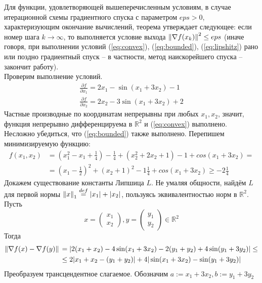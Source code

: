 \documentclass[main.tex]{subfiles}
\begin{document}
Для функции, удовлетворяющей вышеперечисленным условиям, в случае итерационной схемы градиентного спуска с параметром $eps > 0$, характеризующим окончание вычислений, теорема утверждает следующее: 
если номер шага $k\rightarrow \infty$, то выполняется условие выхода $\left\lVert\nabla f(x_k)\right\rVert^2 \le eps$  (иначе говоря, при выполнении условий (\ref{eq:convex}), (\ref{eq:bounded}), (\ref{eq:lipshitz}) рано или поздно градиентный спуск -- в частности, метод наискорейшего спуска -- закончит работу).\\
Проверим выполнение условий.\\
\begin{gather*}
\frac{\partial f}{\partial x_1} = 2x_1 - \sin(x_1+3x_2)-1\\
\frac{\partial f}{\partial x_2} = 2x_2 - 3\sin(x_1+3x_2)+2
\end{gather*}
Частные производные по координатам непрерывны при любых $x_1, x_2$, значит, функция непрерывно дифференцируема в $\mathds{R}^2$ и (\ref{eq:convex}) выполнено.\\
Несложно убедиться, что (\ref{eq:bounded}) также выполнено. Перепишем минимизируемую функцию:
\begin{equation*}
\begin{aligned} %
f(x_1, x_2) {}& = (x_1^2-x_1+\frac{1}{4})-\frac{1}{4}+(x_2^2+2x_2+1)-1 + cos(x_1+3x_2) = \\
 & = (x_1-\frac{1}{2})^2+(x_2+1)^2-1\frac{1}{4}+cos(x_1+3x_2)\ge -2\frac{1}{4}
\end{aligned}
\end{equation*}
Докажем существование константы Липшица $L$. Не умаляя общности, найдём $L$ для первой нормы $\left\lVert x\right\rVert_1\overset{def}{=}|x_1|+|x_2|$, пользуясь эквивалентностью норм в $\mathds{R}^2$. Пусть
\begin{equation*}
x=\begin{pmatrix}x_1\\x_2\end{pmatrix}, y=\begin{pmatrix}y_1\\y_2\end{pmatrix} \in \mathds{R}^2 
\end{equation*}
Тогда
\begin{equation*}
\begin{aligned}
\left\lVert\nabla f(x) - \nabla f(y)\right\rVert {}& = |2(x_1+x_2)-4\sin(x_1+3x_2) -2(y_1+y_2)+4\sin(y_1+3y_2)| \le \\
& \le 2|x_1+x_2-(y_1+y_2)|+4|\sin(x_1+3x_2)-\sin(y_1+3y_2)|  
\end{aligned}
\end{equation*}
Преобразуем трансцендентное слагаемое. Обозначим $a := x_1+3x_2, b := y_1+3y_2$ \\
\end{document}
